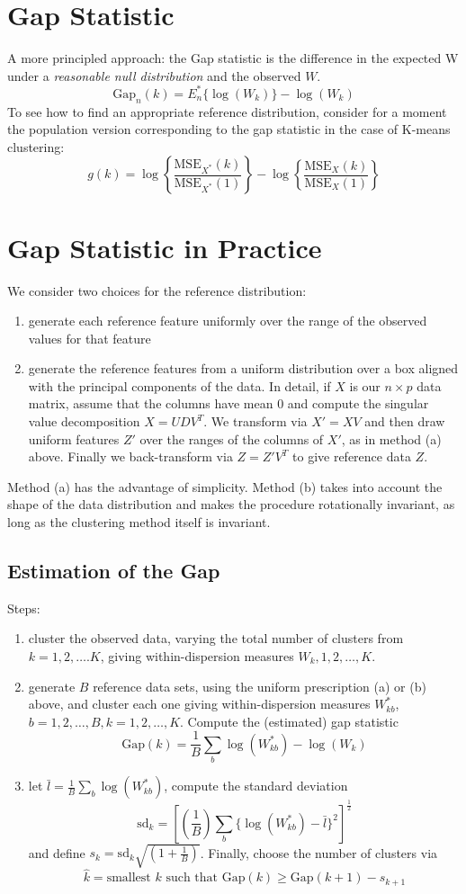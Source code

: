 \documentclass[10pt]{article}
\begin{document}
\section*{Gap Statistic}
A more principled approach: the Gap statistic is the difference in the expected W under a \textit{reasonable null distribution} and the observed $W$.
\[\text{Gap}_n(k) = E_n^* \{\log(W_k)\} - \log(W_k)\]
To see how to find an appropriate reference distribution, consider for a moment the population version corresponding to the gap statistic in the case of K-means clustering:
\[g(k) = \log\left\{ \frac{\text{MSE}_{X^*}(k)}{\text{MSE}_{X^*}(1)}\right\} - \log\left\{ \frac{\text{MSE}_{X}(k)}{\text{MSE}_{X}(1)}\right\}\]

\section*{Gap Statistic in Practice}
We consider two choices for the reference distribution:
\begin{enumerate}[label=(\alph*)]
    \item generate each reference feature uniformly over the range of the observed values for that feature
    \item generate the reference features from a uniform distribution over a box aligned with the principal components of the data.  In detail, if $X$ is our $n \times p$ data matrix, assume that the columns have mean 0 and compute the singular value decomposition $X = UDV^T$.  We transform via $X' = XV$ and then draw uniform features $Z'$ over the ranges of the columns of $X'$, as in method (a) above.  Finally we back-transform via $Z = Z'V^T$ to give reference data $Z$.
\end{enumerate}
Method (a) has the advantage of simplicity.  Method (b) takes into account the shape of the data distribution and makes the procedure rotationally invariant, as long as the clustering method itself is invariant.

\subsection*{Estimation of the Gap}
Steps:
\begin{enumerate}
    \item cluster the observed data, varying the total number of clusters from $k = 1, 2, \dots. K$, giving within-dispersion measures $W_k, 1, 2, \dots, K$.
    \item generate $B$ reference data sets, using the uniform prescription (a) or (b) above, and cluster each one giving within-dispersion measures $W_{kb}^*$, $b = 1,2, \dots, B, k=1, 2, \dots, K$.  Compute the (estimated) gap statistic
    \[\text{Gap}(k) = \frac{1}{B} \sum_b \log(W^*_{kb}) - \log(W_k)\]
    \item let $\bar l = \frac{1}{B} \sum_b \log(W^*_{kb})$, compute the standard deviation
    \[\text{sd}_k = \left[\left(\frac{1}{B}\right) \sum_b \{\log(W^*_{kb}) - \bar l\}^2\right]^{\frac{1}{2}}\]
    and define $s_k = \text{sd}_k \sqrt{(1 + \frac{1}{B})}$.  Finally, choose the number of clusters via
    \[\hat k = \text{smallest } k \text{ such that Gap}(k) \geq \text{Gap}(k + 1) - s_{k + 1}\]
\end{enumerate}
\end{document}
